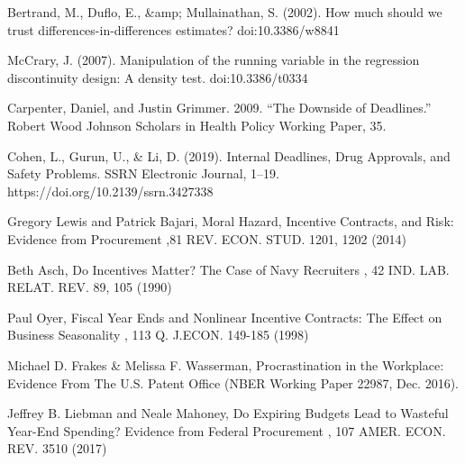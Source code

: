 \documentclass[12pt]{article}
\begin{document}
\begin{referece}
Bertrand, M., Duflo, E., &amp; Mullainathan, S. (2002). How much should we trust differences-in-differences estimates? doi:10.3386/w8841
\end{referece}

\begin{referece}
McCrary, J. (2007). Manipulation of the running variable in the regression discontinuity design: A density test. doi:10.3386/t0334
\end{referece}

\begin{referece}
Carpenter, Daniel, and Justin Grimmer. 2009. “The Downside of Deadlines.” Robert
Wood Johnson Scholars in Health Policy Working Paper, 35.
\end{referece}

\begin{referece}
Cohen, L., Gurun, U., & Li, D. (2019). Internal Deadlines, Drug Approvals, and Safety Problems. SSRN Electronic Journal, 1–19. https://doi.org/10.2139/ssrn.3427338
\end{referece}

\begin{referece}
Gregory Lewis and Patrick Bajari, Moral Hazard, Incentive Contracts, and Risk: Evidence from Procurement ,81 REV. ECON. STUD. 1201, 1202 (2014)
\end{referece}

\begin{referece}
Beth Asch, Do Incentives Matter? The Case of Navy Recruiters , 42 IND. LAB. RELAT. REV. 89, 105 (1990)
\end{referece}

\begin{referece}
Paul Oyer, Fiscal Year Ends and Nonlinear Incentive Contracts: The Effect on Business Seasonality , 113 Q. J.ECON. 149-185 (1998)
\end{referece}

\begin{referece}
Michael D. Frakes & Melissa F. Wasserman, Procrastination in the Workplace: Evidence From The U.S. Patent Office (NBER Working Paper 22987, Dec. 2016).
\end{referece}

\begin{referece}
Jeffrey B. Liebman and Neale Mahoney, Do Expiring Budgets Lead to Wasteful Year-End Spending? Evidence from Federal Procurement , 107 AMER. ECON. REV. 3510 (2017)
\end{referece}
\end{document}
